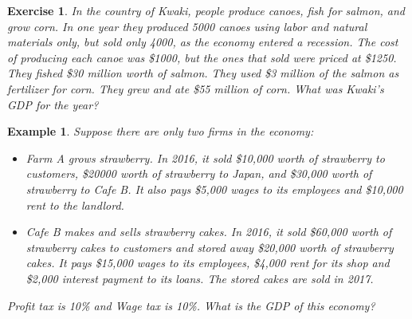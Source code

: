 \documentclass[12pt]{article}
\newtheorem{example}{Example}
\newtheorem{exercise}{Exercise}
\numberwithin{equation}{section}
\begin{document}
\begin{exercise}
    In the country of Kwaki, people produce canoes, fish for salmon, and grow corn. In one year they produced 5000 canoes using labor and natural materials only, but sold only 4000, as the economy entered a recession. The cost of producing each canoe was \$1000, but the ones that sold were priced at \$1250. They fished \$30 million worth of salmon. They used \$3 million of the salmon as fertilizer for corn. They grew and ate \$55 million of corn. What was Kwaki's GDP for the year?
\end{exercise}

\begin{example}
    Suppose there are only two firms in the economy:
    \begin{itemize}
        \item Farm A grows strawberry. In 2016, it sold \$10,000 worth of strawberry to customers, \$20000 worth of strawberry to Japan, and \$30,000 worth of strawberry to Cafe B. It also pays \$5,000 wages to its employees and \$10,000 rent to the landlord.
        \item Cafe B makes and sells strawberry cakes. In 2016, it sold \$60,000 worth of strawberry cakes to customers and stored away \$20,000 worth of strawberry cakes. It pays \$15,000 wages to its employees, \$4,000 rent for its shop and \$2,000 interest payment to its loans. The stored cakes are sold in 2017.
    \end{itemize}
    Profit tax is 10\% and Wage tax is 10\%. What is the GDP of this economy?
\end{example}

\vspace{36pt}
\end{document}
